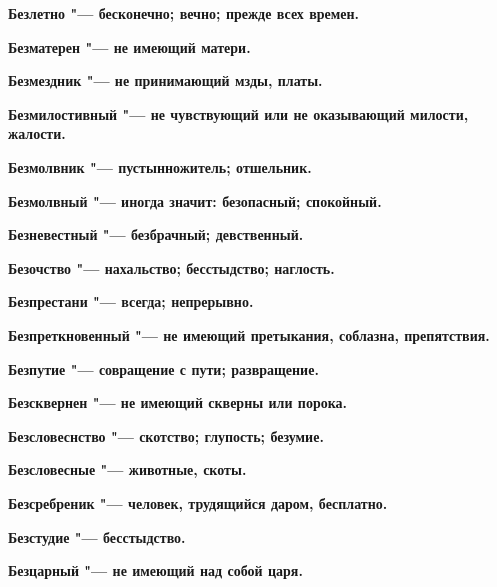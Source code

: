 \bfseries Безлетно \normalfont{} "--- бесконечно; вечно; прежде всех времен. 




\bfseries Безматерен \normalfont{} "--- не имеющий матери. 




\bfseries Безмездник \normalfont{} "--- не принимающий мзды, платы. 




\bfseries Безмилостивный \normalfont{} "--- не чувствующий или не оказывающий милости, жалости. 




\bfseries Безмолвник \normalfont{} "--- пустынножитель; отшельник. 




\bfseries Безмолвный \normalfont{} "--- иногда значит: безопасный; спокойный. 




\bfseries Безневестный \normalfont{} "--- безбрачный; девственный. 




\bfseries Безочство \normalfont{} "--- нахальство; бесстыдство; наглость. 




\bfseries Безпрестани \normalfont{} "--- всегда; непрерывно. 




\bfseries Безпреткновенный \normalfont{} "--- не имеющий претыкания, соблазна, препятствия. 




\bfseries Безпутие \normalfont{} "--- совращение с пути; развращение. 




\bfseries Безсквернен \normalfont{} "--- не имеющий скверны или порока. 




\bfseries Безсловеснство \normalfont{} "--- скотство; глупость; безумие. 




\bfseries Безсловесные \normalfont{} "--- животные, скоты. 




\bfseries Безсребреник \normalfont{} "--- человек, трудящийся даром, бесплатно. 




\bfseries Безстудие \normalfont{} "--- бесстыдство. 




\bfseries Безцарный \normalfont{} "--- не имеющий над собой царя. 




